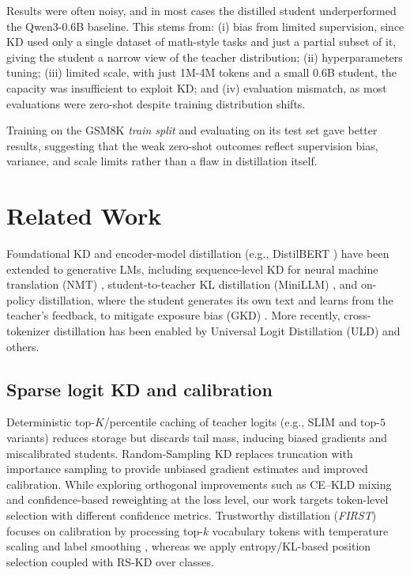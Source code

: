 \documentclass[11pt]{article}
\begin{document}
Results were often noisy, and in most cases the distilled student underperformed the Qwen3-0.6B baseline.
This stems from: (i) bias from limited supervision, since KD used only a single dataset of math-style tasks and just a partial subset of it, giving the student a narrow view of the teacher distribution; (ii) hyperparameters tuning; (iii) limited scale, with just 1M-4M tokens and a small 0.6B student, the capacity was insufficient to exploit KD; and (iv) evaluation mismatch, as most evaluations were zero-shot despite training distribution shifts.  

Training on the GSM8K \emph{train split} and evaluating on its test set gave better results, suggesting that the weak zero-shot outcomes reflect supervision bias, variance, and scale limits rather than a flaw in distillation itself.

\section{Related Work}

Foundational KD \citep{hinton2015distillation} and encoder-model distillation (e.g., DistilBERT \citep{sanh2019distilbert}) have been extended to generative LMs, including sequence-level KD for neural machine translation (NMT) \citep{kim2016sequencekd}, student-to-teacher KL distillation (MiniLLM) \citep{gu2023minillm}, and on-policy distillation, where the student generates its own text and learns from the teacher's feedback, to mitigate exposure bias (GKD) \citep{agarwal2024gkd}.
More recently, cross-tokenizer distillation has been enabled by Universal Logit Distillation (ULD) \citep{boizard2024uld} and others.

\subsection{Sparse logit KD and calibration}
Deterministic top-$K$/percentile caching of teacher logits (e.g., SLIM \citep{raman2023slim} and top-$5$ variants) reduces storage but discards tail mass, inducing biased gradients and miscalibrated students.
Random-Sampling KD \citep{anshumann2025sparse} replaces truncation with importance sampling to provide unbiased gradient estimates and improved calibration.
While exploring orthogonal improvements such as CE--KLD mixing and confidence-based reweighting at the loss level, our work targets token-level selection with different confidence metrics.
Trustworthy distillation (\emph{FIRST}) focuses on calibration by processing top-$k$ vocabulary tokens with temperature scaling and label smoothing \citep{shum2024first}, whereas we apply entropy/KL-based position selection coupled with RS-KD over classes.
\end{document}
